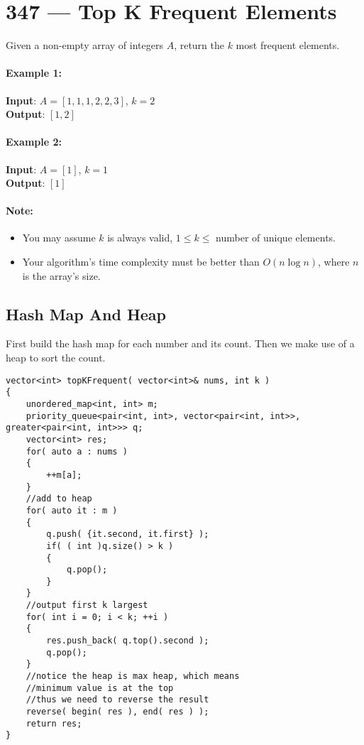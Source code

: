 \section{347 --- Top K Frequent Elements}
Given a non-empty array of integers $ A $, return the $ k $ most frequent elements.

\paragraph{Example 1:}

\begin{flushleft}
\textbf{Input}: $ A = [1,1,1,2,2,3] $, $ k = 2 $
\\
\textbf{Output}: $  [1,2] $
\end{flushleft}

\paragraph{Example 2:}

\begin{flushleft}
\textbf{Input}: $ A = [1] $, $ k = 1 $
\\
\textbf{Output}: $ [1] $
\end{flushleft}

\paragraph{Note:}

\begin{itemize}
\item You may assume $ k $ is always valid, $ 1 \leq k \leq $ number of unique elements.
\item Your algorithm's time complexity must be better than $O(n \log n)$, where $ n $ is the array's size.
\end{itemize}

\subsection{Hash Map And Heap}
First build the hash map for each number and its count. Then we make use of a heap to sort the count. 

\setcounter{lstlisting}{0}
\begin{lstlisting}[style=customc, caption={Heap}]
vector<int> topKFrequent( vector<int>& nums, int k )
{
    unordered_map<int, int> m;
    priority_queue<pair<int, int>, vector<pair<int, int>>, greater<pair<int, int>>> q;
    vector<int> res;
    for( auto a : nums )
    {
        ++m[a];
    }
    //add to heap
    for( auto it : m )
    {
        q.push( {it.second, it.first} );
        if( ( int )q.size() > k )
        {
            q.pop();
        }
    }
    //output first k largest
    for( int i = 0; i < k; ++i )
    {
        res.push_back( q.top().second );
        q.pop();
    }
    //notice the heap is max heap, which means
    //minimum value is at the top
    //thus we need to reverse the result
    reverse( begin( res ), end( res ) );
    return res;
}
\end{lstlisting}

